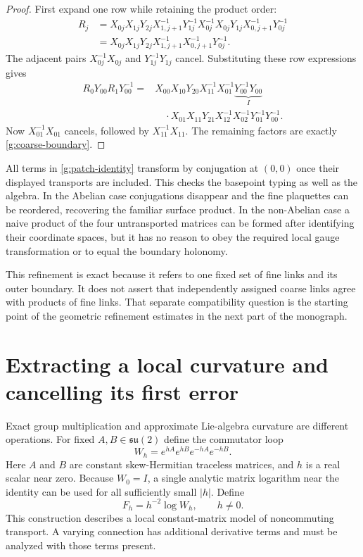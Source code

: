 \begin{proof}
First expand one row while retaining the product order:
\begin{align*}
 R_j
 &=X_{0j}X_{1j}Y_{2j}X_{1,j+1}^{-1}Y_{1j}^{-1}
 X_{0j}^{-1}X_{0j}Y_{1j}X_{0,j+1}^{-1}Y_{0j}^{-1}\\
 &=X_{0j}X_{1j}Y_{2j}X_{1,j+1}^{-1}X_{0,j+1}^{-1}Y_{0j}^{-1}.
\end{align*}
The adjacent pairs $X_{0j}^{-1}X_{0j}$ and $Y_{1j}^{-1}Y_{1j}$ cancel. Substituting these row expressions gives
\begin{align*}
 R_0Y_{00}R_1Y_{00}^{-1}
 ={}&X_{00}X_{10}Y_{20}X_{11}^{-1}X_{01}^{-1}
 \underbrace{Y_{00}^{-1}Y_{00}}_{I}\\
 &\quad\cdot X_{01}X_{11}Y_{21}X_{12}^{-1}X_{02}^{-1}Y_{01}^{-1}Y_{00}^{-1}.
\end{align*}
Now $X_{01}^{-1}X_{01}$ cancels, followed by $X_{11}^{-1}X_{11}$. The remaining factors are exactly \eqref{g:coarse-boundary}.
\end{proof}

All terms in \eqref{g:patch-identity} transform by conjugation at $(0,0)$ once their displayed transports are included. This checks the basepoint typing as well as the algebra. In the Abelian case conjugations disappear and the fine plaquettes can be reordered, recovering the familiar surface product. In the non-Abelian case a naive product of the four untransported matrices can be formed after identifying their coordinate spaces, but it has no reason to obey the required local gauge transformation or to equal the boundary holonomy.

This refinement is exact because it refers to one fixed set of fine links and its outer boundary. It does not assert that independently assigned coarse links agree with products of fine links. That separate compatibility question is the starting point of the geometric refinement estimates in the next part of the monograph.



\section{Extracting a local curvature and cancelling its first error}\label{g:richardson}

Exact group multiplication and approximate Lie-algebra curvature are different operations. For fixed $A,B\in\mathfrak{su}(2)$ define the commutator loop
\begin{equation}\label{g:commutator-loop}
 W_h=e^{hA}e^{hB}e^{-hA}e^{-hB}.
\end{equation}
Here $A$ and $B$ are constant skew-Hermitian traceless matrices, and $h$ is a real scalar near zero. Because $W_0=I$, a single analytic matrix logarithm near the identity can be used for all sufficiently small $|h|$. Define
\begin{equation}\label{g:log-curvature}
 F_h=h^{-2}\log W_h,\qquad h\ne0.
\end{equation}
This construction describes a local constant-matrix model of noncommuting transport. A varying connection has additional derivative terms and must be analyzed with those terms present.


